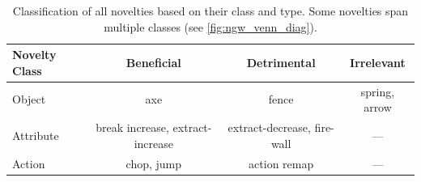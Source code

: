 \begin{table}[!tb]
\begin{center}
\small
\renewcommand{\arraystretch}{1.22}
\begin{tabular}{l c c c}
 \toprule
 \textbf{Novelty Class} & \textbf{Beneficial} & \textbf{Detrimental} & \textbf{Irrelevant} \\
 \midrule
 Object    & axe          & fence             & spring, arrow \\
 Attribute & break increase, extract-increase & extract-decrease, fire-wall & --- \\
 Action    & chop, jump   & action remap      & --- \\
 \bottomrule
\end{tabular}
\caption[Novelty classes and types in \NovelGridworlds{}]{Classification of all novelties based on their class and type. Some novelties span multiple classes (see \cref{fig:ngw_venn_diag}).}
\label{tab:novel_envs}
\end{center}
\end{table}
